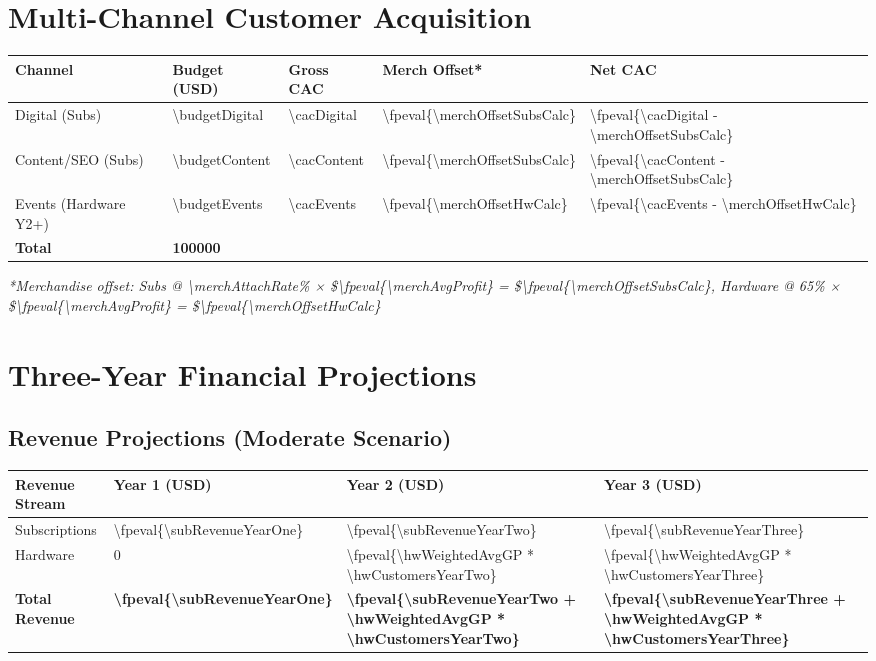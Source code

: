 \documentclass[11pt]{article}
\newcommand{\numfpeval}[1]{\num{\fpeval{#1}}}
\begin{document}
\section{Multi-Channel Customer Acquisition}

\begin{table}[H]
\centering
\begin{tabularx}{\linewidth}{l Y Y Y Y}
\toprule
Channel & Budget (USD) & Gross CAC\cite{authoranalysis2024} & Merch Offset* & Net CAC \\\midrule
Digital (Subs) & \num{\budgetDigital} & \num{\cacDigital} & \numfpeval{\merchOffsetSubsCalc} & \numfpeval{\cacDigital - \merchOffsetSubsCalc} \\
Content/SEO (Subs) & \num{\budgetContent} & \num{\cacContent} & \numfpeval{\merchOffsetSubsCalc} & \numfpeval{\cacContent - \merchOffsetSubsCalc} \\
Events (Hardware Y2+) & \num{\budgetEvents} & \num{\cacEvents} & \numfpeval{\merchOffsetHwCalc} & \numfpeval{\cacEvents - \merchOffsetHwCalc} \\\midrule
\textbf{Total} & \textbf{\num{100000}} &  &  &  \\
\bottomrule
\end{tabularx}
\end{table}
\textit{*Merchandise offset: Subs @ \num{\merchAttachRate}\% × \$\numfpeval{\merchAvgProfit} = \$\numfpeval{\merchOffsetSubsCalc}, Hardware @ \num{65}\% × \$\numfpeval{\merchAvgProfit} = \$\numfpeval{\merchOffsetHwCalc}}

\section{Three-Year Financial Projections}

\subsection{Revenue Projections (Moderate Scenario)}
\begin{table}[H]
\centering
\begin{tabularx}{\linewidth}{l Y Y Y}
\toprule
Revenue Stream & Year 1 (USD) & Year 2 (USD) & Year 3 (USD) \\\midrule
Subscriptions & \numfpeval{\subRevenueYearOne} & \numfpeval{\subRevenueYearTwo} & \numfpeval{\subRevenueYearThree} \\
Hardware & \num{0} & \numfpeval{\hwWeightedAvgGP * \hwCustomersYearTwo} & \numfpeval{\hwWeightedAvgGP * \hwCustomersYearThree} \\\midrule
\textbf{Total Revenue} & \textbf{\numfpeval{\subRevenueYearOne}} & \textbf{\numfpeval{\subRevenueYearTwo + \hwWeightedAvgGP * \hwCustomersYearTwo}} & \textbf{\numfpeval{\subRevenueYearThree + \hwWeightedAvgGP * \hwCustomersYearThree}} \\
\bottomrule
\end{tabularx}
\end{table}
\end{document}
